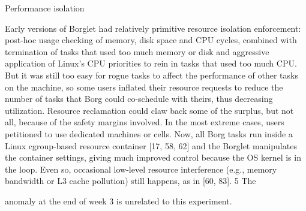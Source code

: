 Performance isolation

Early versions of Borglet had relatively primitive resource
isolation enforcement: post-hoc usage checking of memory,
disk space and CPU cycles, combined with termination of
tasks that used too much memory or disk and aggressive application of Linux’s CPU priorities to rein in tasks that used
too much CPU. But it was still too easy for rogue tasks to affect the performance of other tasks on the machine, so some
users inflated their resource requests to reduce the number of
tasks that Borg could co-schedule with theirs, thus decreasing utilization. Resource reclamation could claw back some
of the surplus, but not all, because of the safety margins involved. In the most extreme cases, users petitioned to use
dedicated machines or cells.
Now, all Borg tasks run inside a Linux cgroup-based resource container [17, 58, 62] and the Borglet manipulates the
container settings, giving much improved control because
the OS kernel is in the loop. Even so, occasional low-level
resource interference (e.g., memory bandwidth or L3 cache
pollution) still happens, as in [60, 83].
5 The

anomaly at the end of week 3 is unrelated to this experiment.

